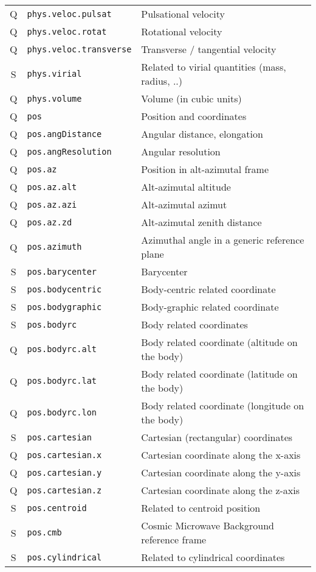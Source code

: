 \documentclass[11pt,a4paper]{ivoa}
\begin{document}
\begin{longtable}[h!]{c|p{40ex}|p{}}
Q & {\tt phys.veloc.pulsat} & Pulsational velocity\\
Q & {\tt phys.veloc.rotat} & Rotational velocity\\
Q & {\tt phys.veloc.transverse} & Transverse / tangential velocity\\
S & {\tt phys.virial} & Related to virial quantities (mass, radius, ..)\\
Q & {\tt phys.volume} & Volume (in cubic units)\\
Q & {\tt pos} & Position and coordinates\\
Q & {\tt pos.angDistance} & Angular distance, elongation\\
Q & {\tt pos.angResolution} & Angular resolution\\
Q & {\tt pos.az} & Position in alt-azimutal frame\\
Q & {\tt pos.az.alt} & Alt-azimutal altitude\\
Q & {\tt pos.az.azi} & Alt-azimutal azimut\\
Q & {\tt pos.az.zd} & Alt-azimutal zenith distance\\
Q & {\tt pos.azimuth} & Azimuthal angle in a generic reference plane\\
S & {\tt pos.barycenter} & Barycenter\\
S & {\tt pos.bodycentric} & Body-centric related coordinate\\
S & {\tt pos.bodygraphic} & Body-graphic related coordinate\\
S & {\tt pos.bodyrc} & Body related coordinates\\
Q & {\tt pos.bodyrc.alt} & Body related coordinate (altitude on the body)\\
Q & {\tt pos.bodyrc.lat} & Body related coordinate (latitude on the body)\\
Q & {\tt pos.bodyrc.lon} & Body related coordinate (longitude on the body)\\
S & {\tt pos.cartesian} & Cartesian (rectangular) coordinates\\
Q & {\tt pos.cartesian.x} & Cartesian coordinate along the x-axis\\
Q & {\tt pos.cartesian.y} & Cartesian coordinate along the y-axis\\
Q & {\tt pos.cartesian.z} & Cartesian coordinate along the z-axis\\
S & {\tt pos.centroid} & Related to centroid position\\
S & {\tt pos.cmb} & Cosmic Microwave Background reference frame\\
S & {\tt pos.cylindrical} & Related to cylindrical coordinates\\

\end{longtable}
\end{document}
